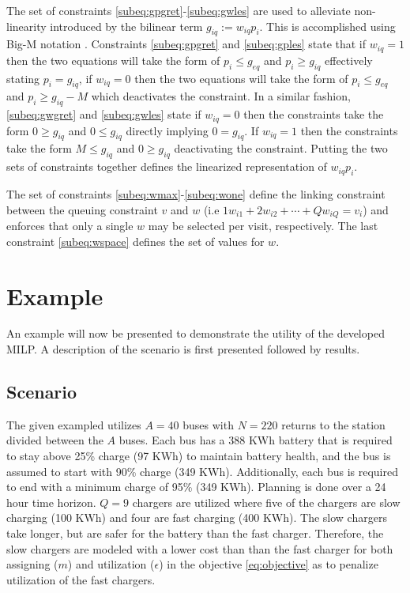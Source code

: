 \documentclass[letterpaper, 10pt, conference]{IEEEtran}
\begin{document}
The set of constraints \eqref{subeq:gpgret}-\eqref{subeq:gwles} are used to alleviate non-linearity introduced by the bilinear term \(g_{iq} := w_{iq} p_i\). This is accomplished using Big-M notation \cite{Rodriguez2013}. Constraints \eqref{subeq:gpgret} and \eqref{subeq:gples} state that if \(w_{iq} = 1\) then the two equations will take the form of \(p_i \leq g_{eq}\) and \(p_i \geq g_{iq}\) effectively stating \(p_i = g_{iq}\), if \(w_{iq} = 0\) then the two equations will take the form of \(p_i \leq g_{eq}\) and \(p_i \geq g_{iq} - M\) which deactivates the constraint. In a similar fashion, \eqref{subeq:gwgret} and \eqref{subeq:gwles} state if \(w_{iq} = 0\) then the constraints take the form \(0 \geq g_{iq}\) and \(0 \leq g_{iq}\) directly implying \(0 = g_{iq}\). If \(w_{iq} = 1\) then the constraints take the form \(M \leq g_{iq}\) and \(0 \geq g_{iq}\) deactivating the constraint. Putting the two sets of constraints together defines the linearized representation of \(w_{iq} p_i\).

The set of constraints \eqref{subeq:wmax}-\eqref{subeq:wone} define the linking constraint between the queuing constraint \(v\) and \(w\) (i.e \(1w_{i1} + 2w_{i2} + \cdots + Qw_{iQ} = v_i\)) and enforces that only a single \(w\) may be selected per visit, respectively. The last constraint \eqref{subeq:wspace} defines the set of values for \(w\).

\section{Example}
\label{sec:example}

An example will now be presented to demonstrate the utility of the developed MILP. A description of the scenario is first presented followed by results.

\subsection{Scenario}
The given exampled utilizes \(A = 40\) buses with \(N = 220\) returns to the station divided between the \(A\) buses. Each bus has a 388 KWh battery that is required to stay above 25\% charge (97 KWh) to maintain battery health, and the bus is assumed to start with 90\% charge (349 KWh). Additionally, each bus is required to end with a minimum charge of 95\% (349 KWh). Planning is done over a 24 hour time horizon. \(Q = 9\) chargers are utilized where five of the chargers are slow charging (100 KWh) and four are fast charging (400 KWh). The slow chargers take longer, but are safer for the battery than the fast charger. Therefore, the slow chargers are modeled with a lower cost than than the fast charger for both assigning (\(m\)) and utilization (\(\epsilon\)) in the objective \eqref{eq:objective} as to penalize utilization of the fast chargers.
\end{document}

